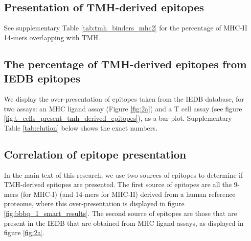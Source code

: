 \clearpage

\subsection{Presentation of TMH-derived epitopes}

See supplementary Table \ref{tab:tmh_binders_mhc2} 
for the percentage of MHC-II 14-mers overlapping with TMH.



\clearpage

\subsection{The percentage of TMH-derived epitopes from IEDB epitopes}

We display the over-presentation of epitopes taken from the
IEDB database, for two assays: an MHC ligand assay (Figure \ref{fig:2a})
and a T cell assay (see figure \ref{fig:t_cells_present_tmh_derived_epitopes}),
as a bar plot.
Supplementary Table \ref{tab:elution} below shows the
exact numbers.



\clearpage



\subsection{Correlation of epitope presentation}

In the main text of this research, we use two sources of epitopes
to determine if TMH-derived epitopes are presented.
The first source of epitopes are all the 9-mers (for MHC-I) (and 14-mers for MHC-II)
derived from a human reference proteome, where this over-presentation
is displayed in figure \ref{fig:bbbq_1_smart_results}.
The second source of epitopes are those that are present in the IEDB
that are obtained from MHC ligand assays,
as displayed in figure \ref{fig:2a}.

